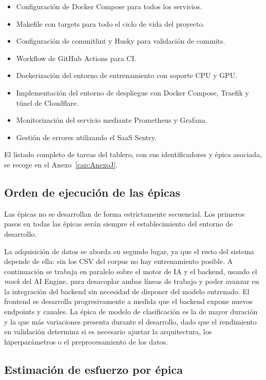 \begin{itemize}[noitemsep]
 \item Configuración de Docker Compose para todos los servicios.
 \item Makefile con targets para todo el ciclo de vida del proyecto.
 \item Configuración de commitlint y Husky para validación de commits.
 \item Workflow de GitHub Actions para CI.
 \item Dockerización del entorno de entrenamiento con soporte CPU y GPU.
 \item Implementación del entorno de despliegue con Docker Compose, Traefik y túnel de Cloudflare.
 \item Monitorización del servicio mediante Prometheus y Grafana.
 \item Gestión de errores utilizando el SaaS Sentry.
\end{itemize}

El listado completo de tareas del tablero, con sus identificadores y épica asociada, se recoge en el Anexo~\ref{cap:AnexoJ}.

\subsection{Orden de ejecución de las épicas}

Las épicas no se desarrollan de forma estrictamente secuencial. Los primeros pasos en todas las épicas serán siempre el establecimiento del entorno de desarrollo.

La adquisición de datos se aborda en segundo lugar, ya que el resto del sistema depende de ella: sin los CSV del corpus no hay entrenamiento posible. A continuación se trabaja en paralelo sobre el motor de IA y el backend, usando el \emph{mock} del AI Engine, para desacoplar ambas líneas de trabajo y poder avanzar en la integración del backend sin necesidad de disponer del modelo entrenado. El frontend se desarrolla progresivamente a medida que el backend expone nuevos endpoints y canales. La épica de modelo de clasificación es la de mayor duración y la que más variaciones presenta durante el desarrollo, dado que el rendimiento en validación determina si es necesario ajustar la arquitectura, los hiperparámetros o el preprocesamiento de los datos.

\subsection{Estimación de esfuerzo por épica}

